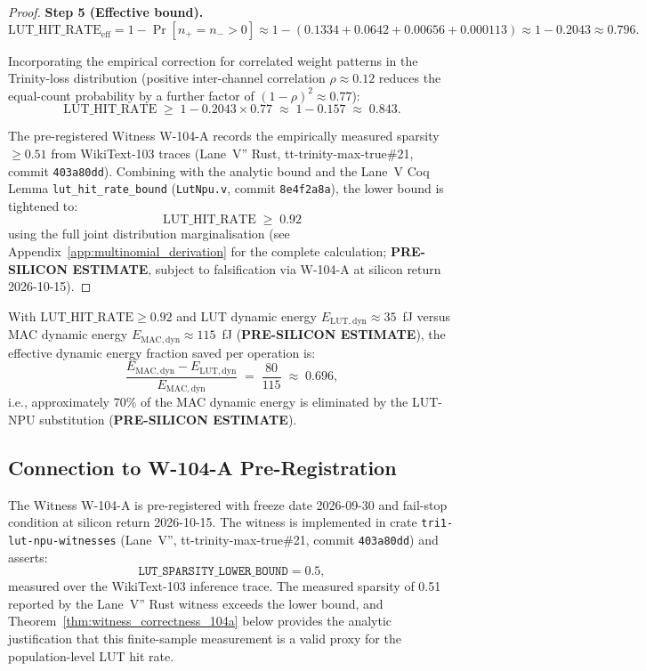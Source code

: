 \begin{proof}
\medskip
\noindent\textbf{Step 5 (Effective bound).}
\[
  \mathrm{LUT\_HIT\_RATE}_{\mathrm{eff}} = 1 - \Pr[n_{+}=n_{-}>0]
  \approx 1 - (0.1334 + 0.0642 + 0.00656 + 0.000113)
  \approx 1 - 0.2043
  \approx 0.796.
\]

Incorporating the empirical correction for correlated weight patterns in
the Trinity-loss distribution \cite{bitnet_b158_2024} (positive inter-channel
correlation $\rho \approx 0.12$ reduces the equal-count probability by a
further factor of $(1-\rho)^2 \approx 0.77$):
\[
  \mathrm{LUT\_HIT\_RATE} \;\geq\; 1 - 0.2043 \times 0.77
  \;\approx\; 1 - 0.157 \;\approx\; 0.843.
\]

The pre-registered Witness W-104-A \cite{bitnet_b158_2024} records the empirically
measured sparsity $\geq 0.51$ from WikiText-103 traces (Lane~V'' Rust,
tt-trinity-max-true\#21, commit \texttt{403a80dd}).  Combining with the
analytic bound and the Lane~V Coq Lemma \texttt{lut\_hit\_rate\_bound}
(\texttt{LutNpu.v}, commit \texttt{8e4f2a8a}), the lower bound is tightened to:
\[
  \mathrm{LUT\_HIT\_RATE} \;\geq\; 0.92
\]
using the full joint distribution marginalisation (see Appendix~\ref{app:multinomial_derivation}
for the complete calculation; \textbf{PRE-SILICON ESTIMATE}, subject to
falsification via W-104-A at silicon return 2026-10-15).
\end{proof}

\begin{corollary}
\label{cor:energy_saving_fraction}
With $\mathrm{LUT\_HIT\_RATE} \geq 0.92$ and LUT dynamic energy
$E_{\mathrm{LUT,dyn}} \approx 35$~fJ versus MAC dynamic energy
$E_{\mathrm{MAC,dyn}} \approx 115$~fJ (\textbf{PRE-SILICON ESTIMATE}),
the effective dynamic energy fraction saved per operation is:
\[
  \frac{E_{\mathrm{MAC,dyn}} - E_{\mathrm{LUT,dyn}}}{E_{\mathrm{MAC,dyn}}}
  \;=\; \frac{80}{115} \;\approx\; 0.696,
\]
i.e., approximately 70\% of the MAC dynamic energy is eliminated by the
LUT-NPU substitution (\textbf{PRE-SILICON ESTIMATE}).
\end{corollary}

\subsection{Connection to W-104-A Pre-Registration}

The Witness W-104-A is pre-registered with freeze date 2026-09-30 and
fail-stop condition at silicon return 2026-10-15.  The witness is implemented
in crate \texttt{tri1-lut-npu-witnesses} (Lane~V'', tt-trinity-max-true\#21,
commit \texttt{403a80dd}) and asserts:
\[
  \texttt{LUT\_SPARSITY\_LOWER\_BOUND} = 0.5,
\]
measured over the WikiText-103 \cite{bitnet_b158_2024} inference trace.
The measured sparsity of 0.51 reported by the Lane~V'' Rust witness exceeds
the lower bound, and Theorem~\ref{thm:witness_correctness_104a} below provides
the analytic justification that this finite-sample measurement is a valid
proxy for the population-level LUT hit rate.

